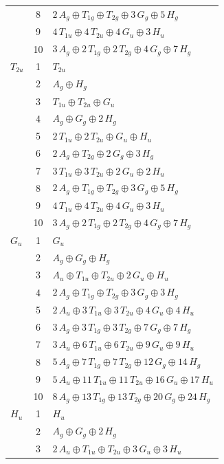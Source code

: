 \documentclass[11pt]{article}
\begin{document}
\begin{longtable}{l c p{}}
 & 8 & $2\,A_{g}\oplus T_{1g}\oplus T_{2g}\oplus 3\,G_{g}\oplus 5\,H_{g}$\\
 & 9 & $4\,T_{1u}\oplus 4\,T_{2u}\oplus 4\,G_{u}\oplus 3\,H_{u}$\\
 & 10 & $3\,A_{g}\oplus 2\,T_{1g}\oplus 2\,T_{2g}\oplus 4\,G_{g}\oplus 7\,H_{g}$\\
\hline
$T_{2u}$ & 1 & $T_{2u}$\\
 & 2 & $A_{g}\oplus H_{g}$\\
 & 3 & $T_{1u}\oplus T_{2u}\oplus G_{u}$\\
 & 4 & $A_{g}\oplus G_{g}\oplus 2\,H_{g}$\\
 & 5 & $2\,T_{1u}\oplus 2\,T_{2u}\oplus G_{u}\oplus H_{u}$\\
 & 6 & $2\,A_{g}\oplus T_{2g}\oplus 2\,G_{g}\oplus 3\,H_{g}$\\
 & 7 & $3\,T_{1u}\oplus 3\,T_{2u}\oplus 2\,G_{u}\oplus 2\,H_{u}$\\
 & 8 & $2\,A_{g}\oplus T_{1g}\oplus T_{2g}\oplus 3\,G_{g}\oplus 5\,H_{g}$\\
 & 9 & $4\,T_{1u}\oplus 4\,T_{2u}\oplus 4\,G_{u}\oplus 3\,H_{u}$\\
 & 10 & $3\,A_{g}\oplus 2\,T_{1g}\oplus 2\,T_{2g}\oplus 4\,G_{g}\oplus 7\,H_{g}$\\
\hline
$G_{u}$ & 1 & $G_{u}$\\
 & 2 & $A_{g}\oplus G_{g}\oplus H_{g}$\\
 & 3 & $A_{u}\oplus T_{1u}\oplus T_{2u}\oplus 2\,G_{u}\oplus H_{u}$\\
 & 4 & $2\,A_{g}\oplus T_{1g}\oplus T_{2g}\oplus 3\,G_{g}\oplus 3\,H_{g}$\\
 & 5 & $2\,A_{u}\oplus 3\,T_{1u}\oplus 3\,T_{2u}\oplus 4\,G_{u}\oplus 4\,H_{u}$\\
 & 6 & $3\,A_{g}\oplus 3\,T_{1g}\oplus 3\,T_{2g}\oplus 7\,G_{g}\oplus 7\,H_{g}$\\
 & 7 & $3\,A_{u}\oplus 6\,T_{1u}\oplus 6\,T_{2u}\oplus 9\,G_{u}\oplus 9\,H_{u}$\\
 & 8 & $5\,A_{g}\oplus 7\,T_{1g}\oplus 7\,T_{2g}\oplus 12\,G_{g}\oplus 14\,H_{g}$\\
 & 9 & $5\,A_{u}\oplus 11\,T_{1u}\oplus 11\,T_{2u}\oplus 16\,G_{u}\oplus 17\,H_{u}$\\
 & 10 & $8\,A_{g}\oplus 13\,T_{1g}\oplus 13\,T_{2g}\oplus 20\,G_{g}\oplus 24\,H_{g}$\\
\hline
$H_{u}$ & 1 & $H_{u}$\\
 & 2 & $A_{g}\oplus G_{g}\oplus 2\,H_{g}$\\
 & 3 & $2\,A_{u}\oplus T_{1u}\oplus T_{2u}\oplus 3\,G_{u}\oplus 3\,H_{u}$\\

\end{longtable}
\end{document}
